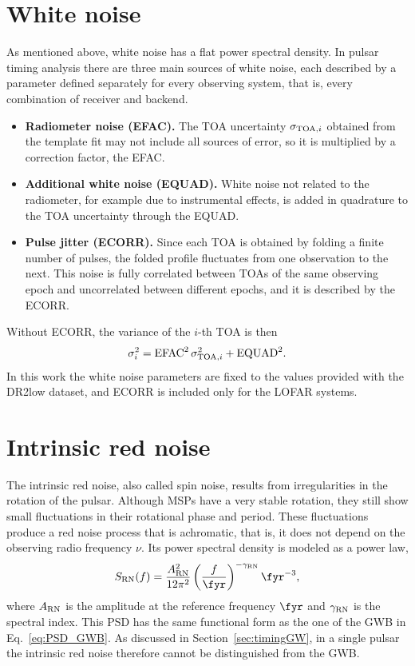 \section{White noise} \label{sec:wn}

As mentioned above, white noise has a flat power spectral density. In pulsar
timing analysis there are three main sources of white noise, each described by
a parameter defined separately for every observing system, that is, every
combination of receiver and backend.
\begin{itemize}
    \item \textbf{Radiometer noise (EFAC).} The TOA uncertainty
    $\sigma_{{\rm TOA},i}$ obtained from the template fit may not include all
    sources of error, so it is multiplied by a correction factor, the EFAC.
    \item \textbf{Additional white noise (EQUAD).} White noise not related to
    the radiometer, for example due to instrumental effects, is added in
    quadrature to the TOA uncertainty through the EQUAD.
    \item \textbf{Pulse jitter (ECORR).} Since each TOA is obtained by folding a
    finite number of pulses, the folded profile fluctuates from one observation
    to the next. This noise is fully correlated between TOAs of the same
    observing epoch and uncorrelated between different epochs, and it is
    described by the ECORR.
\end{itemize}
Without ECORR, the variance of the $i$-th TOA is then
\begin{equation}
    \sigma_i^2 = \mathrm{EFAC}^2\,\sigma_{{\rm TOA},i}^2 + \mathrm{EQUAD}^2 .
    \label{eq:sigma_wn}
\end{equation}
In this work the white noise parameters are fixed to the values provided with
the DR2low dataset, and ECORR is included only for the LOFAR systems.

\section{Intrinsic red noise} \label{sec:rn}

The intrinsic red noise, also called spin noise, results from irregularities in
the rotation of the pulsar. Although MSPs have a very stable rotation, they
still show small fluctuations in their rotational phase and period. These
fluctuations produce a red noise process that is achromatic, that is, it does
not depend on the observing radio frequency $\nu$. Its power spectral density is
modeled as a power law,
\begin{equation}
    S_{\rm RN}(f) = \frac{A_{\rm RN}^2}{12\pi^2}
    \left(\frac{f}{\fyr}\right)^{-\gamma_{\rm RN}}\fyr^{-3},
    \label{eq:PSD_RN}
\end{equation}
where $A_{\rm RN}$ is the amplitude at the reference frequency $\fyr$ and
$\gamma_{\rm RN}$ is the spectral index. This PSD has the same functional form
as the one of the GWB in Eq.~\eqref{eq:PSD_GWB}. As discussed in
Section~\ref{sec:timingGW}, in a single pulsar the intrinsic red noise therefore
cannot be distinguished from the GWB.

